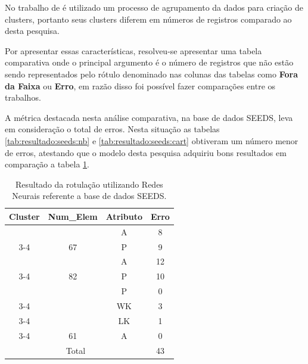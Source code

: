No trabalho de  é utilizado um processo de agrupamento da dados para criação de clusters, portanto seus clusters diferem em números de registros comparado ao desta pesquisa. 


Por apresentar essas características, resolveu-se apresentar uma tabela comparativa onde o principal argumento é o número de registros que não estão sendo representados pelo rótulo denominado nas colunas das tabelas como \textbf{Fora da Faixa} ou \textbf{Erro}, em razão disso  foi possível fazer comparações entre os trabalhos.

% 

A métrica destacada nesta análise comparativa, na base de dados SEEDS, leva em consideração o total de erros. Nesta situação as tabelas \ref{tab:resultado:seeds:nb} e \ref{tab:resultado:seeds:cart} obtiveram um número menor de erros, atestando que o modelo desta pesquisa adquiriu bons resultados em comparação a tabela \ref{tab:resultado:seeds:rn}.


\begin{table}[]
\centering
\caption{Resultado da rotulação utilizando Redes Neurais \cite{LOPES2014}  referente a base de dados SEEDS.}
\label{tab:resultado:seeds:rn}
\begin{tabular}{|c|c|c|c|}
\hline
\rowcolor[HTML]{EFEFEF} 
Cluster             & Num\_Elem             & Atributo & Erro \\ \hline
                    &                      & A        & 8    \\ \cline{3-4} 
\multirow{-2}{*}{1} & \multirow{-2}{*}{67} & P        & 9    \\ \hline
                    &                      & A        & 12   \\ \cline{3-4} 
\multirow{-2}{*}{2} & \multirow{-2}{*}{82} & P        & 10   \\ \hline
                    &                      & P        & 0    \\ \cline{3-4} 
                    &                      & WK       & 3    \\ \cline{3-4} 
                    &                      & LK       & 1    \\ \cline{3-4} 
\multirow{-4}{*}{3} & \multirow{-4}{*}{61} & A        & 0    \\ \hline
\multicolumn{3}{|c|}{Total}                           & 43   \\ \hline
\end{tabular}
\end{table}

